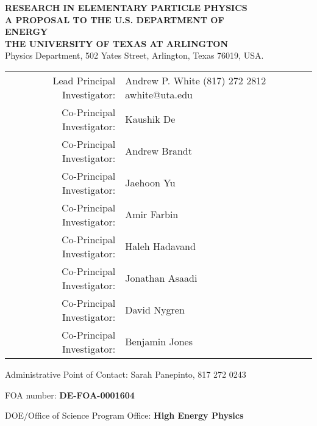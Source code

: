 \newpage
\begin{center}


{\Large\bf RESEARCH IN ELEMENTARY PARTICLE PHYSICS}  \\
\vspace{.75in}
{\Large\bf A PROPOSAL TO THE U.S. DEPARTMENT OF} \\
\vspace*{0.15in}
{\Large\bf  ENERGY} \\
\vspace{0.5in}
{\Large\bf THE UNIVERSITY OF TEXAS AT ARLINGTON} \\
Physics Department, 502 Yates Street, Arlington, Texas 76019, USA.

\vspace{0.5in}
%
\begin{table}[htb]
\centering
\renewcommand{\arraystretch}{1.15}
\begin{tabular}{rl} %
    Lead Principal Investigator:    & Andrew P. White  (817) 272 2812 awhite@uta.edu   \\
    Co-Principal Investigator:   & Kaushik De                       \\
    Co-Principal Investigator:   & Andrew Brandt                    \\
    Co-Principal Investigator:   & Jaehoon Yu                       \\
    Co-Principal Investigator:   & Amir Farbin                      \\
	Co-Principal Investigator:   & Haleh Hadavand                   \\
	Co-Principal Investigator:   & Jonathan Asaadi                  \\
	Co-Principal Investigator:   & David Nygren                     \\
	Co-Principal Investigator:   & Benjamin Jones                   \\

	\end{tabular}
\renewcommand{\arraystretch}{1.0}
\end{table}

Administrative Point of Contact: Sarah Panepinto, 817 272 0243
\vspace*{0.15in}

FOA number:  \textbf{DE-FOA-0001604}
\vspace*{0.15in}

DOE/Office of Science Program Office: \textbf{High Energy Physics}
\vspace*{0.15in}


\end{center}
